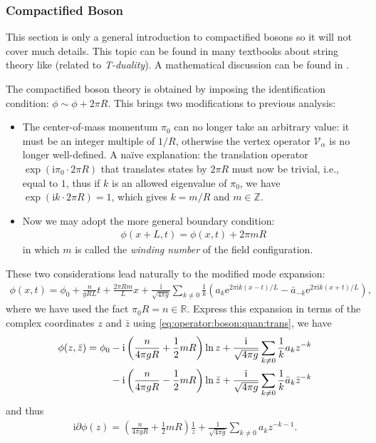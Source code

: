 \documentclass[10pt]{article}
\newcommand{\me}{\mathrm{e}}
\newcommand{\ii}{\mathrm{i}}
\begin{document}
\subsubsection{Compactified Boson}
\begin{notice}
    This section is only a general introduction to compactified bosons so it will not cover much details.
    This topic can be found in many textbooks about string theory like \cite{Polchinski:1998rq,Zwiebach:2004tj}(related to \textit{T-duality}).
    A mathematical discussion can be found in \cite{Ribault:2014hia}. 
\end{notice}
The compactified boson theory is obtained by imposing the identification condition: $\phi\sim\phi+2\pi R$.
This brings two modifications to previous analysis:
\begin{itemize}
    \item The center-of-mass momentum $\pi_0$ can no longer take an arbitrary value: it must be an integer multiple of $1/R$,  otherwise the vertex operator $\mathcal{V}_\alpha$ is no longer well-defined.
          A na\"ive explanation\cite{Dixon:1989nr}: the translation operator $\exp(\ii \pi_0\cdot2\pi R)$ that translates states by $2\pi R$ must now be trivial, i.e., equal to $1$, thus if $k$ is an allowed eigenvalue of $\pi_0$, we have $\exp(\ii k\cdot2\pi R)=1$, which gives $k=m/R$ and $m\in\mathbb{Z}$.
    \item Now we may adopt the more general boundary condition:
          \begin{align}
              \phi(x+L,t)=\phi(x,t)+2\pi mR
          \end{align}
          in which $m$ is called the \textit{winding number} of the field configuration.
\end{itemize}
These two considerations lead naturally to the modified mode expansion:
\begin{align}
    \phi(x,t)=\phi_0+\frac{n}{gRL}t+\frac{2\pi Rm}{L}x+\frac{\ii}{\sqrt{4\pi g}}\sum_{k\neq0}\frac{1}{k}\left(a_k\me^{2\pi\ii k(x-t)/L}-\bar{a}_{-k}\me^{2\pi\ii k(x+t)/L}\right),
\end{align}
where we have used the fact $\pi_0 R=n\in\mathbb{R}$.
Express this expansion in terms of the complex coordinates $z$ and $\bar{z}$ using \cref{eq:operator:boson:quan:trans}, we have 
\begin{align}
    \phi(z,\bar{z})=\phi_0 & -\ii\left(\frac{n}{4\pi gR}+\frac{1}{2}mR\right)\ln{z}+\frac{\ii}{\sqrt{4\pi g}}\sum_{k\neq0}\frac{1}{k}a_k z^{-k}\notag            \\
                           & -\ii\left(\frac{n}{4\pi gR}-\frac{1}{2}mR\right)\ln{\bar{z}}+\frac{\ii}{\sqrt{4\pi g}}\sum_{k\neq0}\frac{1}{k}\bar{a}_k\bar{z}^{-k}
\end{align}
and thus 
\begin{align}
    \ii\partial\phi(z)=\left(\frac{n}{4\pi gR}+\frac{1}{2}mR\right)\frac{1}{z}+\frac{1}{\sqrt{4\pi g}}\sum_{k\neq0}a_k z^{-k-1}.
\end{align}
\end{document}
